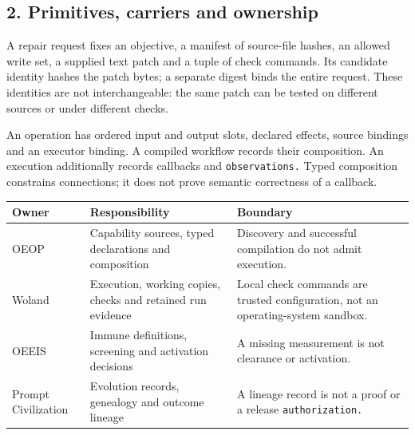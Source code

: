 \documentclass[
  11pt,
]{article}
\begin{document}
\subsection{2. Primitives, carriers and
ownership}\label{primitives-carriers-and-ownership}

A repair request fixes an objective, a manifest of source-file hashes,
an allowed write set, a supplied text patch and a tuple of check
commands. Its candidate identity hashes the patch bytes; a separate
digest binds the entire request. These identities are not
interchangeable: the same patch can be tested on different sources or
under different checks.

An operation has ordered input and output slots, declared effects,
source bindings and an executor binding. A compiled workflow records
their composition. An execution additionally records callbacks and
\nolinkurl{observations.} Typed composition constrains connections; it
does not prove semantic correctness of a callback.

\begin{longtable}[]{@{}
  >{\raggedright\arraybackslash}p{}
  >{\raggedright\arraybackslash}p{}
  >{\raggedright\arraybackslash}p{}@{}}
\toprule\noalign{}
\begin{minipage}[b]{\linewidth}\raggedright
Owner
\end{minipage} & \begin{minipage}[b]{\linewidth}\raggedright
Responsibility
\end{minipage} & \begin{minipage}[b]{\linewidth}\raggedright
Boundary
\end{minipage} \\
\midrule\noalign{}
\endhead
\bottomrule\noalign{}
\endlastfoot
OEOP & Capability sources, typed declarations and composition &
Discovery and successful compilation do not admit execution. \\
Woland & Execution, working copies, checks and retained run evidence &
Local check commands are trusted configuration, not an operating-system
sandbox. \\
OEEIS & Immune definitions, screening and activation decisions & A
missing measurement is not clearance or activation. \\
Prompt Civilization & Evolution records, genealogy and outcome lineage &
A lineage record is not a proof or a release
\nolinkurl{authorization.} \\
\end{longtable}
\end{document}
